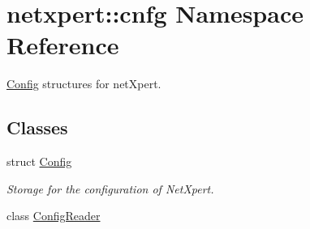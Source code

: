 \hypertarget{namespacenetxpert_1_1cnfg}{}\section{netxpert\+:\+:cnfg Namespace Reference}
\label{namespacenetxpert_1_1cnfg}


\hyperlink{structnetxpert_1_1cnfg_1_1Config}{Config} structures for net\+Xpert.  


\subsection*{Classes}
\begin{DoxyCompactItemize}
\item 
struct \hyperlink{structnetxpert_1_1cnfg_1_1Config}{Config}
\begin{DoxyCompactList}\small\item\em Storage for the configuration of Net\+Xpert. \end{DoxyCompactList}\item 
class \hyperlink{classnetxpert_1_1cnfg_1_1ConfigReader}{Config\+Reader}
\end{DoxyCompactItemize}
